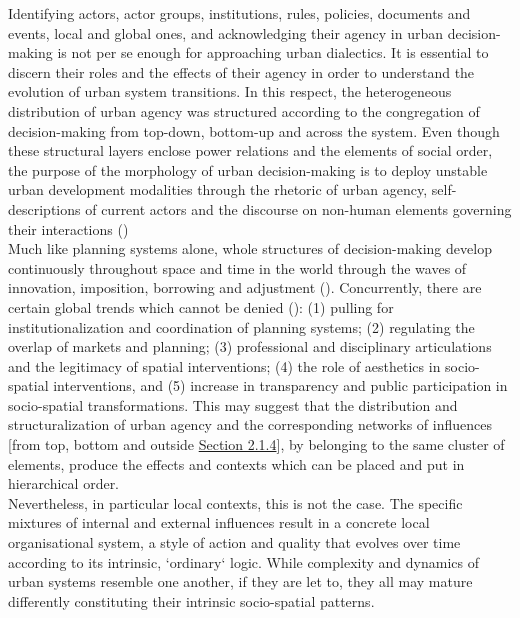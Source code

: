 \documentclass[11pt]{report}
\begin{document}
{{{Identifying actors, actor groups, institutions, rules, policies, documents and events, local and global ones, and acknowledging their agency in urban decision-making is not per se enough for approaching urban dialectics.
It is essential to discern their roles and the effects of their agency in order to understand the evolution of urban system transitions.
In this respect, the heterogeneous distribution of urban agency was structured according to the congregation of decision-making from top-down, bottom-up and across the system.
Even though these structural layers enclose power relations and the elements of social order, the purpose of the morphology of urban decision-making is to deploy unstable urban development modalities 
through the rhetoric of urban agency, self-descriptions of current actors and the discourse on non-human elements governing their interactions (\href{Van}{\citealt{van_assche_co-evolutions_2013}})
\\

Much like planning systems alone, whole structures of decision-making develop continuously throughout space and time in the world through the waves of innovation,  imposition,  borrowing  and  adjustment
(\href{Nedovic}{\citealt{nedovicbudic_waves_2006}}).
Concurrently, there are certain global trends which cannot be denied
(\href{Van}{\citealt{van_assche_co-evolutions_2013}}):
(1) pulling for institutionalization and coordination of planning systems;
(2) regulating the overlap of markets and planning;
(3) professional and disciplinary articulations and the legitimacy of spatial interventions;
(4) the role of aesthetics in socio-spatial interventions, and
(5) increase in transparency and public participation in socio-spatial transformations.
This may suggest that the distribution and structuralization of urban agency and the corresponding networks of influences [from top, bottom and outside
\href{Section 2.1.4}{Section 2.1.4}], by belonging to the same cluster of elements, produce the effects and contexts which can be placed and put in hierarchical order. 
\\

Nevertheless, in particular local contexts, this is not the case. The specific mixtures of internal and external influences result in a concrete local organisational system, a style of action and quality that evolves over time according to its intrinsic, ‘ordinary‘ logic. While complexity and dynamics of urban systems resemble one another, if they are let to, they all may mature differently constituting their intrinsic socio-spatial patterns.

}}}
\end{document}
